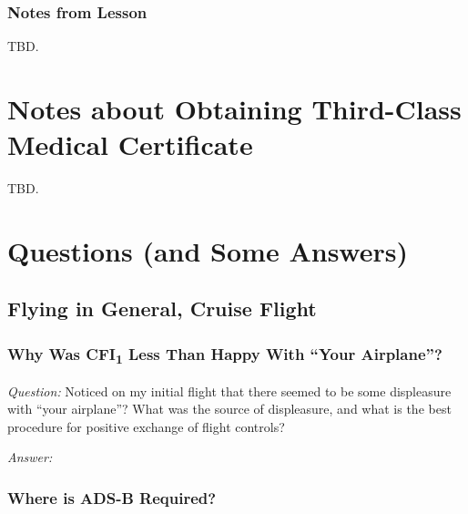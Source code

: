 \documentclass[letterpaper,10pt,titlepage]{article}
\begin{document}

\subsubsection{Notes from Lesson}
\label{sfle0:scfa0:snff0}

TBD.


\section{Notes about Obtaining Third-Class Medical Certificate}
\label{stcm0}

TBD.


\section{Questions (and Some Answers)}
\label{sqsa0}



\subsection{Flying in General, Cruise Flight}
\label{sqsa0:sfig0}


\subsubsection{Why Was CFI\textsubscript{1} Less Than Happy With ``Your Airplane''?}
\label{sqsa0:sfig0:slhy0}

\emph{Question:} Noticed on my initial flight that there seemed to be some
displeasure with ``your airplane''?  What was the source of displeasure, and what
is the best procedure for positive exchange of flight controls?

\noindent{}\emph{Answer:}


\subsubsection{Where is ADS-B Required?}
\label{sqsa0:sfig0:sads0}
\end{document}
